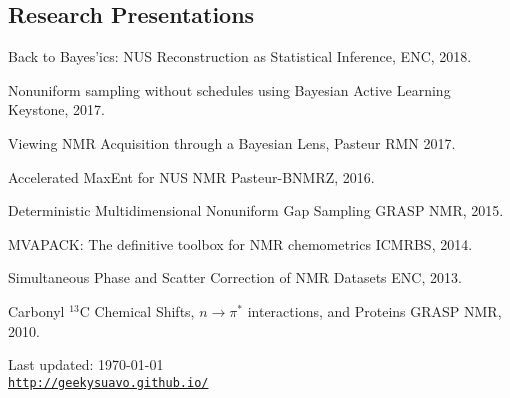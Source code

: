 \documentclass[letterpaper]{article}
\def\footerlink{http://geekysuavo.github.io/}
\renewenvironment{itemize}{
  \begin{list}{}{
    \setlength{\leftmargin}{1.5em}
  }
}{
  \end{list}
}
\begin{document}
\subsection*{Research Presentations}

\begin{itemize}
 \item Back to Bayes'ics: NUS Reconstruction as Statistical Inference,
  \hfill ENC, 2018.

 \item Nonuniform sampling without schedules using Bayesian Active Learning
  \hfill Keystone, 2017.

 \item Viewing NMR Acquisition through a Bayesian Lens,
  \hfill Pasteur RMN 2017.

 \item Accelerated MaxEnt for NUS NMR
  \hfill Pasteur-BNMRZ, 2016.

 \item Deterministic Multidimensional Nonuniform Gap Sampling
  \hfill GRASP NMR, 2015.

 \item MVAPACK: The definitive toolbox for NMR chemometrics
  \hfill ICMRBS, 2014.

 \item Simultaneous Phase and Scatter Correction of NMR Datasets
  \hfill ENC, 2013.

 \item Carbonyl $^{13}$C Chemical Shifts, $n\rightarrow\pi^*$ interactions,
  and Proteins \hfill GRASP NMR, 2010.
\end{itemize}

\bigskip

\begin{center}
  \begin{footnotesize}
    Last updated: \today \\
    \href{\footerlink}{\texttt{\footerlink}}
  \end{footnotesize}
\end{center}

\end{document}
